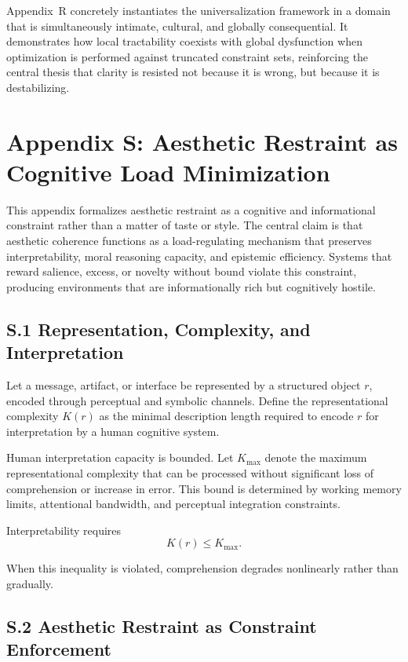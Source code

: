 \documentclass[11pt]{article}
\begin{document}
Appendix~R concretely instantiates the universalization framework in a domain that is simultaneously intimate, cultural, and globally consequential. It demonstrates how local tractability coexists with global dysfunction when optimization is performed against truncated constraint sets, reinforcing the central thesis that clarity is resisted not because it is wrong, but because it is destabilizing.

\section{Appendix S: Aesthetic Restraint as Cognitive Load Minimization}
\label{app:aesthetic-detailed}

This appendix formalizes aesthetic restraint as a cognitive and informational constraint rather than a matter of taste or style. The central claim is that aesthetic coherence functions as a load-regulating mechanism that preserves interpretability, moral reasoning capacity, and epistemic efficiency. Systems that reward salience, excess, or novelty without bound violate this constraint, producing environments that are informationally rich but cognitively hostile.

\subsection{S.1 Representation, Complexity, and Interpretation}

Let a message, artifact, or interface be represented by a structured object \(r\), encoded through perceptual and symbolic channels. Define the representational complexity \(K(r)\) as the minimal description length required to encode \(r\) for interpretation by a human cognitive system.

Human interpretation capacity is bounded. Let \(K_{\max}\) denote the maximum representational complexity that can be processed without significant loss of comprehension or increase in error. This bound is determined by working memory limits, attentional bandwidth, and perceptual integration constraints.

Interpretability requires
\[
K(r) \le K_{\max}.
\]

When this inequality is violated, comprehension degrades nonlinearly rather than gradually.

\subsection{S.2 Aesthetic Restraint as Constraint Enforcement}
\end{document}
